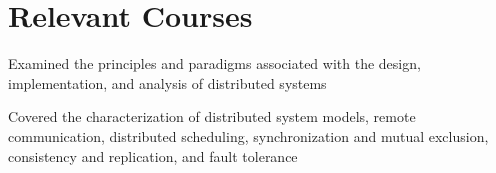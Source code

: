 \documentclass[]{brandon_ginoza_resume}
\begin{document}
\hfill
\begin{minipage}[t]{0.66\textwidth} 




\section{Relevant Courses}





\vspace{\topsep} %
\begin{tightemize}
	\item Examined the principles and paradigms associated with the design, implementation, and analysis of distributed systems
	\item Covered the characterization of distributed system models, remote communication, distributed scheduling, synchronization and mutual exclusion, consistency and replication, and fault tolerance
\end{tightemize}
\sectionsep



\end{minipage}
\end{document}

